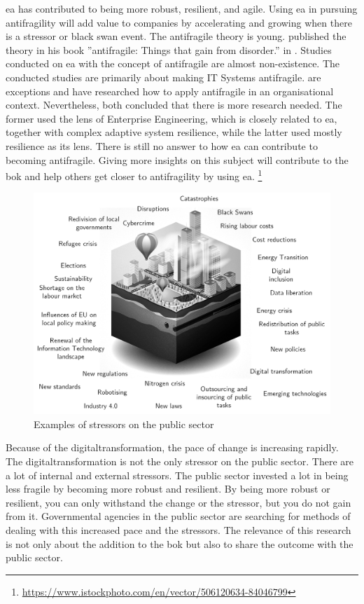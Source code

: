 \acrshort{ea} has contributed to being more \gls{robust}, \gls{resilient}, and \gls{agile}. Using \acrshort{ea} in pursuing \gls{antifragility} will add value to companies by accelerating and growing when there is a stressor or black swan event. The \gls{antifragile} theory is young.  \citeauthor{Taleb2012} published the theory in his book ''\Gls{antifragile}: Things that gain from disorder.'' in \citeyear{Taleb2012}.  Studies conducted on \acrshort{ea} with the concept of \gls{antifragile} are almost non-existence. The conducted studies are primarily about making IT Systems \gls{antifragile}. \textcite{Botjes2020,Kastner2017} are exceptions and have researched how to apply \gls{antifragile} in an organisational context. Nevertheless, both concluded that there is more research needed. The former used the lens of Enterprise Engineering, which is closely related to \acrshort{ea}, together with complex adaptive system resilience, while the latter used mostly resilience as its lens. There is still no answer to how \acrshort{ea} can contribute to becoming \gls{antifragile}. Giving more insights on this subject will contribute to the \acrshort{bok} and help others get closer to \gls{antifragility} by using \acrshort{ea}.
{\let\thefootnote\relax\footnote{{\url{https://www.istockphoto.com/en/vector/506120634-84046799}}}}
\begin{figure}[H]
	\centering
	\includegraphics[width=0.8\linewidth]{images/publicstressors}
	\caption[Examples of stressors on the public sector]{Examples of stressors on the public sector}
	\label{fig:publicstressors}
\end{figure}


Because of the \gls{digitaltransformation}, the pace of change is increasing rapidly.  The \gls{digitaltransformation} is not the only stressor on the public sector. There are a lot of internal and external stressors. The public sector invested a lot in being less fragile by becoming more robust and resilient. By being more robust or resilient, you can only withstand the change or the stressor, but you do not gain from it. Governmental agencies in the public sector are searching for methods of dealing with this increased pace and the stressors. The relevance of this research is not only about the addition to the \acrshort{bok} but also to share the outcome with the public sector.

